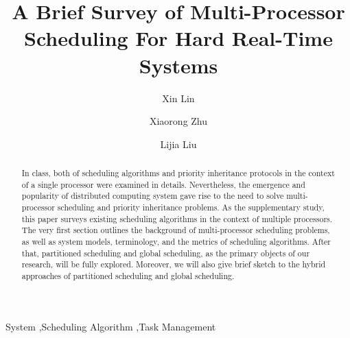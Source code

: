\documentclass[preprint,12pt]{elsarticle}
\begin{document}
\begin{frontmatter}



\title{A Brief Survey of Multi-Processor Scheduling For Hard Real-Time Systems}


\author[UTCS]{Xin Lin}
\author[UTCS]{Xiaorong Zhu}
\author[UTCS]{Lijia Liu}

\address[UTCS]{Department of Computer Science, The University of Texas at Austin}

\begin{abstract}
In class, both of scheduling algorithms \cite{liu1973scheduling} and priority
inheritance protocols \cite{sha1990priority} in
the context of a single processor were examined in details.  Nevertheless, the
emergence and popularity of distributed computing system gave rise to the
need to solve multi-processor scheduling and priority inheritance problems. 
As the supplementary study, this paper surveys existing scheduling algorithms in
the context of multiple processors. The very first section outlines the
background of multi-processor scheduling problems, as well as system models,
terminology, and the metrics of scheduling algorithms. After that, partitioned
scheduling and global scheduling, as the primary objects of our research, will
be fully explored. Moreover, we will also give brief sketch to the hybrid
approaches of partitioned scheduling and global scheduling. 
\end{abstract}

\begin{keyword}
System \sep Scheduling Algorithm \sep Task Management


\end{keyword}

\end{frontmatter}
\end{document}
